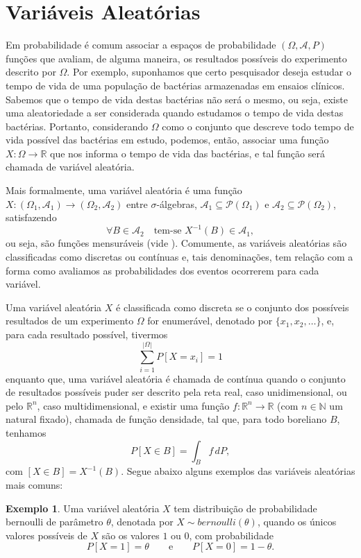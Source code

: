 \documentclass[twoside,openright,titlepage,numbers=noenddot,headinclude,  lineheaders footinclude=true,cleardoublepage=empty,
                                BCOR=5mm,paper=a4,fontsize=12pt ]{scrbook}
\theoremstyle{definition}
\newtheorem{exmp}{Exemplo}[section]
\begin{document}
\section{Vari\'aveis Aleat\'orias}
Em probabilidade é comum associar a espaços de probabilidade $(\Omega, \mathscr{A}, P)$ funções que avaliam, de 
alguma maneira, os resultados possíveis do experimento descrito por $\Omega$. Por exemplo, suponhamos que certo pesquisador
deseja estudar o tempo de vida de uma população de bactérias armazenadas em ensaios clínicos. Sabemos que
o tempo de vida destas bactérias não será o mesmo, ou seja, existe uma aleatoriedade a ser considerada quando
estudamos o tempo de vida destas bactérias. Portanto, considerando $\Omega$ como o conjunto que descreve todo tempo de vida 
possível das bactérias
em estudo, podemos, então, associar uma função $X: \Omega \rightarrow \mathbb{R}$ que nos informa o tempo
de vida das bactérias, e tal função será chamada de variável aleatória. 

Mais formalmente, uma  variável aleatória
é uma função $X: (\Omega_1, \mathscr{A}_1) \rightarrow (\Omega_2, \mathscr{A}_2)$ entre $\sigma$-álgebras,
$\mathscr{A}_1 \subseteq \mathscr{P}(\Omega_1)$ e $\mathscr{A}_2 \subseteq \mathscr{P}(\Omega_2)$, satisfazendo
\[
\forall B \in \mathscr{A}_2 \quad \text{tem-se } X^{-1}(B) \in \mathscr{A}_1,
\]
ou seja, são funções mensuráveis (vide \cite{isnard}).
Comumente, as variáveis aleatórias são classificadas como discretas ou contínuas e, tais 
denominações, tem relação com a forma como avaliamos as probabilidades dos eventos ocorrerem para
cada variável.

Uma variável aleatória $X$ é classificada como discreta se o conjunto dos possíveis resultados de um
experimento $\Omega$ for enumerável, denotado por $\{x_1, x_2, \ldots\}$, e, para cada resultado possível, tivermos
\[
\sum_{i = 1}^{|\Omega|} P[ X = x_i ] = 1
\]
enquanto que, uma variável aleatória é chamada de contínua quando o conjunto de resultados possíveis
puder ser descrito pela reta real, caso unidimensional, ou pelo $\mathbb{R}^n$, caso
multidimensional, e existir uma função $f: \mathbb{R}^n \rightarrow \mathbb{R}$ (com $n \in \mathbb{N}$
um natural fixado), chamada de função densidade, tal que, para todo boreliano $B$, tenhamos
\[
P[ X \in B] = \int_B f\, dP,
\]
com $[X \in B] = X^{-1}(B)$. Segue
abaixo alguns exemplos das variáveis aleatórias mais comuns:
\begin{exmp}
Uma variável aleatória $X$ tem distribuição de probabilidade bernoulli de parâmetro $\theta$,
denotada por $X \sim bernoulli(\theta)$, quando os únicos valores possíveis de $X$ são os
valores $1$ ou $0$, com probabilidade
\[
P[X = 1] = \theta \qquad \text{e} \qquad P[X = 0] = 1 - \theta.
\]
\end{exmp}
 
\end{document}
